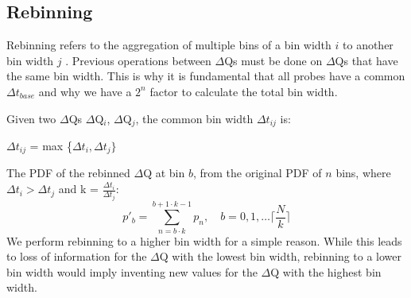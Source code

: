    \subsection{Rebinning}
            Rebinning refers to the aggregation of multiple bins of a bin width $i$ to another bin width $j$ \cite{rebin}. 
            Previous operations between $\Delta$Qs must be done on $\Delta$Qs that have the same bin width. This is why it is fundamental that all probes have a common $\Delta t_{base}$ and why we have a $2^n$ factor to calculate the total bin width.

            Given two $\Delta$Qs $\Delta$Q$_i$, $\Delta$Q$_j$, the common bin width $\Delta t_{ij}$ is:
            \begin{center}
                $\Delta t_{ij}$ = max \{$\Delta t_i, \Delta t_j \}$
            \end{center}
            The PDF of the rebinned $\Delta$Q at bin $b$, from the original PDF of $n$ bins, where $\Delta t_i > \Delta t_j$ and k = $\frac{\Delta t_i}{\Delta t_j}$:
            \begin{equation}
                p'_b = \sum_{n=b \cdot k}^{b+ 1 \cdot k - 1} p_n, \quad b=0,1,\dots \lceil \frac{N}{k} \rceil  
                \label{eq:rebin}
            \end{equation}
            We perform rebinning to a higher bin width for a simple reason. While this leads to loss of information for the $\Delta$Q with the lowest bin width, rebinning to a lower bin width would imply inventing new values for the $\Delta$Q with the highest bin width.

